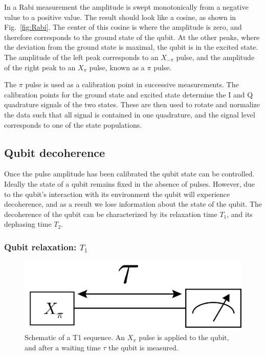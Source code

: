         In a Rabi measurement the amplitude is swept monotonically from a negative value to a positive value. The result should look like a cosine, as shown in Fig.~\ref{fig:Rabi}. The center of this cosine is where the amplitude is zero, and therefore corresponds to the ground state of the qubit. At the other peaks, where the deviation from the ground state is maximal, the qubit is in the excited state. The amplitude of the left peak corresponds to an $X_{-\pi}$ pulse, and the amplitude of the right peak to an $X_\pi$ pulse, known as a $\pi$ pulse.

        The $\pi$ pulse is used as a calibration point in successive measurements. The calibration points for the ground state and excited state determine the I and Q quadrature signals of the two states. These are then used to rotate and normalize the data such that all signal is contained in one quadrature, and the signal level corresponds to one of the state populations.

      \subsection{Qubit decoherence}
        Once the pulse amplitude has been calibrated the qubit state can be controlled. Ideally the state of a qubit remains fixed in the absence of pulses. However, due to the qubit's interaction with its environment the qubit will experience decoherence, and as a result we lose information about the state of the qubit. The decoherence of the qubit can be characterized by its relaxation time $T_1$, and its dephasing time $T_2$.

        \subsubsection{Qubit relaxation: $T_1$}
          \label{sec:Qubit relaxation: $T_1$}
          \begin{figure}
            \begin{center}
            \vspace{-30pt}
              \includegraphics[width=\textwidth]{Figures/Qubit characterization/T1 decoherence.png}
            \end{center}
            \vspace{-20 pt}
            \caption{Schematic of a T1 sequence. An $X_\pi$ pulse is applied to the qubit, and after a waiting time $\tau$ the qubit is measured.}
            \label{fig:T1 schematic}
          \end{figure}


